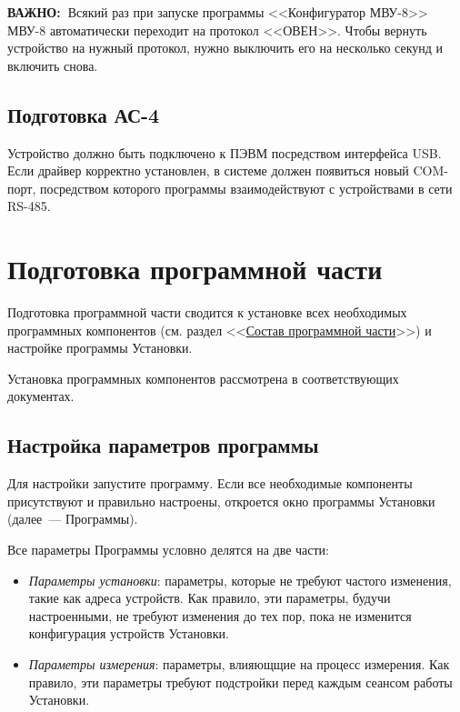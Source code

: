 \documentclass[12pt, a4paper, twocolumn]{book}
\newcommand{\IMPORTANT}{

{\bf ВАЖНО:~}}
\begin{document}
\IMPORTANT Всякий раз при запуске программы <<Конфигуратор МВУ-8>> МВУ-8 автоматически переходит на протокол <<ОВЕН>>. Чтобы вернуть устройство на нужный протокол, нужно выключить его на несколько секунд и включить снова.

\subsection{Подготовка АС-4}

Устройство должно быть подключено к ПЭВМ посредством интерфейса USB. Если драйвер корректно установлен, в системе должен появиться новый COM-порт, посредством которого программы взаимодействуют с устройствами в сети RS-485.

\section{Подготовка программной части}

Подготовка программной части сводится к установке всех необходимых программных компонентов (см. раздел <<\hyperref[sec_software]{Состав программной части}>>) и настройке программы Установки.

Установка программных компонентов рассмотрена в соответствующих документах.

\subsection{Настройка параметров программы}

Для настройки запустите программу. Если все необходимые компоненты присутствуют и правильно настроены, откроется окно программы Установки (далее~--- Программы).

Все параметры Программы условно делятся на две части:

\begin{itemize}

\item \emph{Параметры установки}: параметры, которые не требуют частого изменения, такие как адреса устройств. Как правило, эти параметры, будучи настроенными, не требуют изменения до тех пор, пока не изменится конфигурация устройств Установки.

\item \emph{Параметры измерения}: параметры, влияющщие на процесс измерения. Как правило, эти параметры требуют подстройки перед каждым сеансом работы Установки.

\end{itemize}
\end{document}
